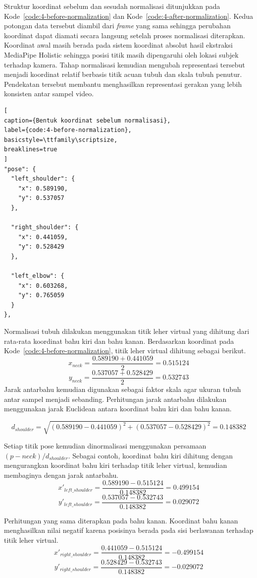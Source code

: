 Struktur koordinat sebelum dan sesudah normalisasi ditunjukkan pada Kode~\ref{code:4-before-normalization} dan Kode~\ref{code:4-after-normalization}. 
Kedua potongan data tersebut diambil dari \textit{frame} yang sama sehingga perubahan koordinat dapat diamati secara langsung setelah proses normalisasi diterapkan. 
Koordinat awal masih berada pada sistem koordinat absolut hasil ekstraksi MediaPipe Holistic sehingga posisi titik masih dipengaruhi oleh lokasi subjek terhadap kamera. 
Tahap normalisasi kemudian mengubah representasi tersebut menjadi koordinat relatif berbasis titik acuan tubuh dan skala tubuh penutur. 
Pendekatan tersebut membantu menghasilkan representasi gerakan yang lebih konsisten antar sampel video.

\begin{lstlisting}[
caption={Bentuk koordinat sebelum normalisasi},
label={code:4-before-normalization},
basicstyle=\ttfamily\scriptsize,
breaklines=true
]
"pose": {
  "left_shoulder": {
    "x": 0.589190,
    "y": 0.537057
  },

  "right_shoulder": {
    "x": 0.441059,
    "y": 0.528429
  },

  "left_elbow": {
    "x": 0.603268,
    "y": 0.765059
  }
},
\end{lstlisting}

Normalisasi tubuh dilakukan menggunakan titik leher virtual yang dihitung dari rata-rata koordinat bahu kiri dan bahu kanan. 
Berdasarkan koordinat pada Kode~\ref{code:4-before-normalization}, titik leher virtual dihitung sebagai berikut.
\[
x_{neck} = \frac{0.589190 + 0.441059}{2} = 0.515124
\]
\[
y_{neck} = \frac{0.537057 + 0.528429}{2} = 0.532743
\]
Jarak antarbahu kemudian digunakan sebagai faktor skala agar ukuran tubuh antar sampel menjadi sebanding. 
Perhitungan jarak antarbahu dilakukan menggunakan jarak Euclidean antara koordinat bahu kiri dan bahu kanan.

\[
d_{shoulder} =
\sqrt{(0.589190 - 0.441059)^2 + (0.537057 - 0.528429)^2}
= 0.148382
\]

Setiap titik pose kemudian dinormalisasi menggunakan persamaan $(p - neck) / d_{shoulder}$. 
Sebagai contoh, koordinat bahu kiri dihitung dengan mengurangkan koordinat bahu kiri terhadap titik leher virtual, kemudian membaginya dengan jarak antarbahu.
\[
x'_{left\_shoulder} =
\frac{0.589190 - 0.515124}{0.148382}
= 0.499154
\]
\[
y'_{left\_shoulder} =
\frac{0.537057 - 0.532743}{0.148382}
= 0.029072
\]

Perhitungan yang sama diterapkan pada bahu kanan. 
Koordinat bahu kanan menghasilkan nilai negatif karena posisinya berada pada sisi berlawanan terhadap titik leher virtual.
\[
x'_{right\_shoulder} =
\frac{0.441059 - 0.515124}{0.148382}
= -0.499154
\]
\[
y'_{right\_shoulder} =
\frac{0.528429 - 0.532743}{0.148382}
= -0.029072
\]

